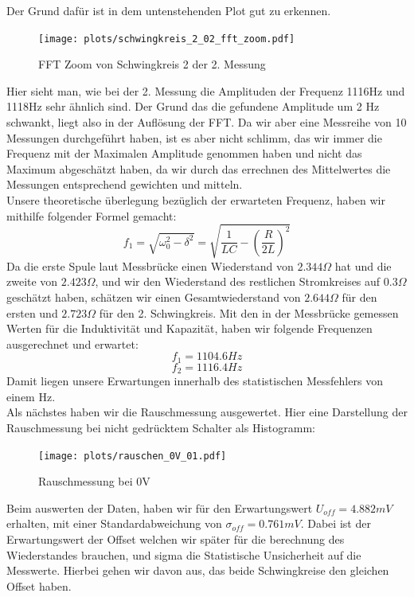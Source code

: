 \documentclass[twoside]{protokoll}
\begin{document}
Der Grund dafür ist in dem untenstehenden Plot gut zu erkennen.
\begin{figure}[H]
    \centering
    \texttt{[image: plots/schwingkreis\_2\_02\_fft\_zoom.pdf]}
    \caption{FFT Zoom von Schwingkreis 2 der 2. Messung}
    \label{fig:peak}
\end{figure}
Hier sieht man, wie bei der 2. Messung die Amplituden der Frequenz 1116Hz und 1118Hz sehr ähnlich sind.
Der Grund das die gefundene Amplitude um 2 Hz schwankt, liegt also in der Auflösung der FFT.
Da wir aber eine Messreihe von 10 Messungen durchgeführt haben, ist es aber nicht schlimm, das wir immer die Frequenz mit der Maximalen Amplitude genommen haben und nicht das Maximum abgeschätzt haben,
da wir durch das errechnen des Mittelwertes die Messungen entsprechend gewichten und mitteln. \\

Unsere theoretische überlegung bezüglich der erwarteten Frequenz, haben wir mithilfe folgender Formel gemacht:
\begin{equation}
    f_1 = \sqrt{\omega_0^2 - \delta^2} = \sqrt{ \frac{1}{LC} - \left( \frac{R}{2L} \right)^2}
\end{equation}
Da die erste Spule laut Messbrücke einen Wiederstand von $ 2.344  \Omega$ hat und die zweite von $2.423 \Omega$, und wir den Wiederstand des restlichen Stromkreises auf $0.3 \Omega$ geschätzt haben, schätzen wir einen Gesamtwiederstand von $ 2.644 \Omega$ für den ersten und $ 2.723 \Omega$ für den 2. Schwingkreis.
Mit den in der Messbrücke gemessen Werten für die Induktivität und Kapazität, haben wir folgende Frequenzen ausgerechnet und erwartet:
\begin{equation}
    f_1 = 1104.6 Hz
\end{equation}
\begin{equation}
    f_2 = 1116.4 Hz
\end{equation}
Damit liegen unsere Erwartungen innerhalb des statistischen Messfehlers von einem Hz. \\

Als nächstes haben wir die Rauschmessung ausgewertet. Hier eine Darstellung der Rauschmessung bei nicht gedrücktem Schalter als Histogramm:
\begin{figure}[H]
    \centering
    \texttt{[image: plots/rauschen\_0V\_01.pdf]}
    \caption{Rauschmessung bei 0V}
\end{figure}
Beim auswerten der Daten, haben wir für den Erwartungswert $ U_{off} = 4.882 mV$ erhalten, mit einer Standardabweichung von $\sigma_{off} = 0.761 mV$.
Dabei ist der Erwartungswert der Offset welchen wir später für die berechnung des Wiederstandes brauchen, und sigma die Statistische Unsicherheit auf die Messwerte.
Hierbei gehen wir davon aus, das beide Schwingkreise den gleichen Offset haben.
\end{document}
